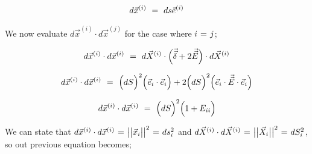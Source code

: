 \documentclass{article}
\begin{document}
\begin{equation} \label{eq:1}
d \vec{x}^{( i )}  \hspace{0.125cm} = \hspace{0.125cm} ds  \vec{e}^{( i )} 
\end{equation} 

We now evaluate \begin{math} d \vec{x}^{( i )} \cdot d \vec{x}^{( j )} \end{math} for the case where \begin{math} i \hspace{0.025cm} = \hspace{0.025cm} j \end{math};

\begin{equation} \label{eq:1}
d \vec{x}^{( i )} \cdot d \vec{x}^{( i )} \hspace{0.125cm} = \hspace{0.125cm} d \vec{X}^{( i )} \cdot \Big( \vec{\vec{\delta}} + 2 \vec{\vec{E}} \Big) \cdot d \vec{X}^{( i )} 
\end{equation} 

\begin{equation} \label{eq:1}
d \vec{x}^{( i )} \cdot d \vec{x}^{( i )} \hspace{0.125cm} = \hspace{0.125cm} \Big( dS \Big)^2 \Big( \vec{e}_i \cdot \vec{e}_i \Big) + 2 \Big( dS \Big)^2  \Big( \vec{e}_i \cdot \vec{\vec{E}} \cdot \vec{e}_i \Big) 
\end{equation} 

\begin{equation} \label{eq:1}
d \vec{x}^{( i )} \cdot d \vec{x}^{( i )} \hspace{0.125cm} = \hspace{0.125cm} \Big( dS \Big)^2 \Big( 1 + E_{i i} \Big) 
\end{equation} 

We can state that \begin{math} d \vec{x}^{( i )} \cdot d \vec{x}^{( i )} \hspace{0.025cm} = \hspace{0.025cm} \big| \big| \vec{x}_i \big| \big|^2  \hspace{0.025cm} = \hspace{0.025cm} ds_{i}^{2} \end{math} and \begin{math} d \vec{X}^{( i )} \cdot d \vec{X}^{( i )} \hspace{0.025cm} = \hspace{0.025cm} \big| \big| \vec{X}_i \big| \big|^2  \hspace{0.025cm} = \hspace{0.025cm} dS_{i}^{2} \end{math}, so out previous equation becomes;
\end{document}
